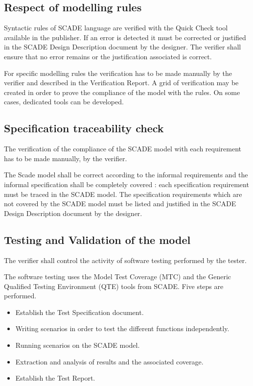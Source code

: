 \documentclass{article}
\begin{document}
\subsection{Respect of modelling rules}

Syntactic rules of SCADE language are verified with the Quick Check tool available in the publisher. If an error is detected it must be corrected or justified in the SCADE Design Description document by the designer. The verifier shall ensure that no error remains or the justification associated is correct.

For specific modelling rules the verification has to be made manually by the verifier and described in the Verification Report. A grid of verification may be created in order to prove the compliance of the model with the rules. On some cases, dedicated tools can be developed.

\subsection{Specification traceability check}

The verification of the compliance of the SCADE model with each requirement has to be made manually, by the verifier. 

The Scade model shall be correct according to the informal requirements and the informal specification shall be completely covered : each specification requirement must be traced in the SCADE model. The specification requirements which are not covered by the SCADE model must be listed and justified in the SCADE Design Description document by the designer.

\subsection{Testing and Validation of the model}

The verifier shall control the activity of software testing performed by the tester.

The software testing uses the Model Test Coverage (MTC) and the Generic Qualified Testing Environment (QTE) tools from SCADE. Five steps are performed.
\begin{itemize}
\item Establish the Test Specification document.
\item Writing scenarios in order to test the different functions independently.
\item Running scenarios on the SCADE model.
\item Extraction and analysis of results and the associated coverage.
\item Establish the Test Report.
\end{itemize}
\end{document}
